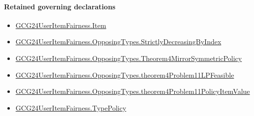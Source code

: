 \documentclass[10pt]{article}
\begin{document}
\paragraph{Retained governing declarations}
\begin{itemize}\raggedright
\item \hyperlink{governing-declaration-a7c560a429c6e204}{GCG24\allowbreak{}User\allowbreak{}Item\allowbreak{}Fairness.\allowbreak{}Item}
\item \hyperlink{governing-declaration-8278344d2ddef9a8}{GCG24\allowbreak{}User\allowbreak{}Item\allowbreak{}Fairness.\allowbreak{}Opposing\allowbreak{}Types.\allowbreak{}Strictly\allowbreak{}Decreasing\allowbreak{}By\allowbreak{}Index}
\item \hyperlink{governing-declaration-00d15cf288402d6b}{GCG24\allowbreak{}User\allowbreak{}Item\allowbreak{}Fairness.\allowbreak{}Opposing\allowbreak{}Types.\allowbreak{}Theorem4\allowbreak{}Mirror\allowbreak{}Symmetric\allowbreak{}Policy}
\item \hyperlink{governing-declaration-8c4140d04ab0e31c}{GCG24\allowbreak{}User\allowbreak{}Item\allowbreak{}Fairness.\allowbreak{}Opposing\allowbreak{}Types.\allowbreak{}theorem4\allowbreak{}Problem11\allowbreak{}LP\allowbreak{}Feasible}
\item \hyperlink{governing-declaration-9dd6ffc03d249aa8}{GCG24\allowbreak{}User\allowbreak{}Item\allowbreak{}Fairness.\allowbreak{}Opposing\allowbreak{}Types.\allowbreak{}theorem4\allowbreak{}Problem11\allowbreak{}Policy\allowbreak{}Item\allowbreak{}Value}
\item \hyperlink{governing-declaration-dc7776cb642fa9dc}{GCG24\allowbreak{}User\allowbreak{}Item\allowbreak{}Fairness.\allowbreak{}Type\allowbreak{}Policy}
\end{itemize}
\end{document}
